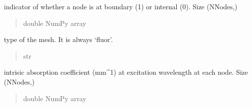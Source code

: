 \documentclass[letterpaper,10pt,english]{sphinxmanual}
\begin{document}
\begin{fulllineitems}

\begin{fulllineitems}
\label{\detokenize{_autosummary/nirfasterff.base.fluor_mesh.fluormesh:nirfasterff.base.fluor_mesh.fluormesh.bndvtx}}
\pysigstartsignatures
\pysigline
{}
\pysigstopsignatures
\sphinxAtStartPar
indicator of whether a node is at boundary (1) or internal (0). Size (NNodes,)
\begin{quote}\begin{description}
\sphinxAtStartPar
double NumPy array

\end{description}\end{quote}

\end{fulllineitems}


\begin{fulllineitems}
\label{\detokenize{_autosummary/nirfasterff.base.fluor_mesh.fluormesh:nirfasterff.base.fluor_mesh.fluormesh.type}}
\pysigstartsignatures
\pysigline
{}
\pysigstopsignatures
\sphinxAtStartPar
type of the mesh. It is always ‘fluor’.
\begin{quote}\begin{description}
\sphinxAtStartPar
str

\end{description}\end{quote}

\end{fulllineitems}


\begin{fulllineitems}
\label{\detokenize{_autosummary/nirfasterff.base.fluor_mesh.fluormesh:nirfasterff.base.fluor_mesh.fluormesh.muax}}
\pysigstartsignatures
\pysigline
{}
\pysigstopsignatures
\sphinxAtStartPar
intrisic absorption coefficient (mm\textasciicircum{}\sphinxhyphen{}1) at excitation wavelength at each node. Size (NNodes,)
\begin{quote}\begin{description}
\sphinxAtStartPar
double NumPy array


\end{description}
\end{quote}
\end{fulllineitems}
\end{fulllineitems}
\end{document}
